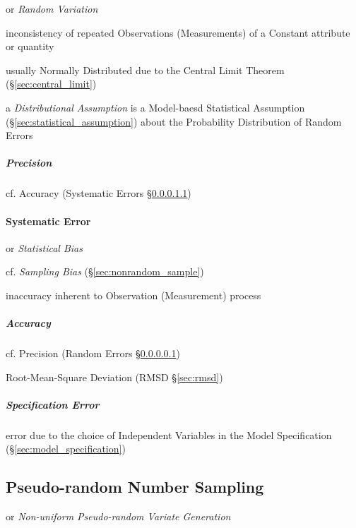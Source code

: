 or \emph{Random Variation}

inconsistency of repeated Observations (Measurements) of a Constant attribute or
quantity

usually Normally Distributed due to the Central Limit Theorem
(\S\ref{sec:central_limit})

\fist a \emph{Distributional Assumption} is a Model-baesd Statistical Assumption
(\S\ref{sec:statistical_assumption}) about the Probability Distribution of
Random Errors



\subparagraph{Precision}\label{sec:precision}\hfill

cf. Accuracy (Systematic Errors \S\ref{sec:accuracy})



\paragraph{Systematic Error}\label{sec:systematic_error}\hfill

or \emph{Statistical Bias}

cf. \emph{Sampling Bias} (\S\ref{sec:nonrandom_sample})

inaccuracy inherent to Observation (Measurement) process



\subparagraph{Accuracy}\label{sec:accuracy}\hfill

cf. Precision (Random Errors \S\ref{sec:precision})

\fist Root-Mean-Square Deviation (RMSD \S\ref{sec:rmsd})



\subparagraph{Specification Error}\label{sec:specification_error}\hfill


error due to the choice of Independent Variables in the Model Specification
(\S\ref{sec:model_specification})



\subsection{Pseudo-random Number Sampling}\label{sec:pseudorandom_sampling}

or \emph{Non-uniform Pseudo-random Variate Generation}

